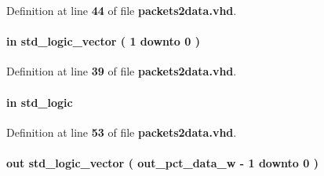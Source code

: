 Definition at line {\bf 44} of file {\bf packets2data.\+vhd}.

\paragraph[{sample\+\_\+width}]{ {\bfseries \textcolor{keywordflow}{in}\textcolor{vhdlchar}{ }} {\bfseries \textcolor{comment}{std\+\_\+logic\+\_\+vector}\textcolor{vhdlchar}{ }\textcolor{vhdlchar}{(}\textcolor{vhdlchar}{ }\textcolor{vhdlchar}{ } \textcolor{vhdldigit}{1} \textcolor{vhdlchar}{ }\textcolor{keywordflow}{downto}\textcolor{vhdlchar}{ }\textcolor{vhdlchar}{ } \textcolor{vhdldigit}{0} \textcolor{vhdlchar}{ }\textcolor{vhdlchar}{)}\textcolor{vhdlchar}{ }} \hspace{0.3cm}{\ttfamily [Port]}}\label{classpackets2data_aa4357f9a7d7e21fa49f9ce61eec07e23}


Definition at line {\bf 39} of file {\bf packets2data.\+vhd}.

\paragraph[{smpl\+\_\+buff\+\_\+full}]{ {\bfseries \textcolor{keywordflow}{in}\textcolor{vhdlchar}{ }} {\bfseries \textcolor{comment}{std\+\_\+logic}\textcolor{vhdlchar}{ }} \hspace{0.3cm}{\ttfamily [Port]}}\label{classpackets2data_a47ef3d4071ff51ce3b91d25ec85f8f2f}


Definition at line {\bf 53} of file {\bf packets2data.\+vhd}.

\paragraph[{smpl\+\_\+buff\+\_\+q}]{ {\bfseries \textcolor{keywordflow}{out}\textcolor{vhdlchar}{ }} {\bfseries \textcolor{comment}{std\+\_\+logic\+\_\+vector}\textcolor{vhdlchar}{ }\textcolor{vhdlchar}{(}\textcolor{vhdlchar}{ }\textcolor{vhdlchar}{ }\textcolor{vhdlchar}{ }\textcolor{vhdlchar}{ }{\bfseries {\bf out\+\_\+pct\+\_\+data\+\_\+w}} \textcolor{vhdlchar}{-\/}\textcolor{vhdlchar}{ } \textcolor{vhdldigit}{1} \textcolor{vhdlchar}{ }\textcolor{keywordflow}{downto}\textcolor{vhdlchar}{ }\textcolor{vhdlchar}{ } \textcolor{vhdldigit}{0} \textcolor{vhdlchar}{ }\textcolor{vhdlchar}{)}\textcolor{vhdlchar}{ }} \hspace{0.3cm}{\ttfamily [Port]}}\label{classpackets2data_ac0b2c64b9b6f3eda9c78c9807d8753dd}


